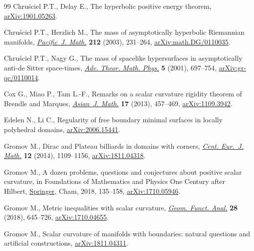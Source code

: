 \documentclass[pdftex]{sigma}
\numberwithin{equation}{section}
\theoremstyle{definition}
\begin{document}
\begin{thebibliography}{99}
Chru\'sciel P.T., Delay E., The hyperbolic positive energy theorem,
 \href{https://arxiv.org/abs/1901.05263}{arXiv:1901.05263}.

Chru\'sciel P.T., Herzlich M., The mass of asymptotically hyperbolic
 {R}iemannian manifolds, \href{https://doi.org/10.2140/pjm.2003.212.231}{\textit{Pacific~J. Math.}} \textbf{212} (2003),
 231--264, \href{https://arxiv.org/abs/math.DG/0110035}{arXiv:math.DG/0110035}.

Chru\'sciel P.T., Nagy G., The mass of spacelike hypersurfaces in
 asymptotically anti-de {S}itter space-times, \href{https://doi.org/10.4310/ATMP.2001.v5.n4.a3}{\textit{Adv. Theor. Math. Phys.}}
 \textbf{5} (2001), 697--754, \href{https://arxiv.org/abs/gr-qc/0110014}{arXiv:gr-qc/0110014}.

Cox G., Miao P., Tam L.-F., Remarks on a scalar curvature rigidity theorem of
 {B}rendle and {M}arques, \href{https://doi.org/10.4310/AJM.2013.v17.n3.a4}{\textit{Asian~J. Math.}} \textbf{17} (2013),
 457--469, \href{https://arxiv.org/abs/1109.3942}{arXiv:1109.3942}.

Edelen N., Li C., Regularity of free boundary minimal surfaces in locally
 polyhedral domains, \href{https://arxiv.org/abs/2006.15441}{arXiv:2006.15441}.

Gromov M., Dirac and {P}lateau billiards in domains with corners, \href{https://doi.org/10.2478/s11533-013-0399-1}{\textit{Cent.
 Eur.~J. Math.}} \textbf{12} (2014), 1109--1156, \href{https://arxiv.org/abs/1811.04318}{arXiv:1811.04318}.

Gromov M., A dozen problems, questions and conjectures about positive scalar
 curvature, in Foundations of Mathematics and Physics One Century after
 {H}ilbert, \href{https://doi.org/10.1007/978-3-319-64813-2_6}{Springer}, Cham, 2018, 135--158, \href{https://arxiv.org/abs/1710.05946}{arXiv:1710.05946}.

Gromov M., Metric inequalities with scalar curvature, \href{https://doi.org/10.1007/s00039-018-0453-z}{\textit{Geom. Funct.
 Anal.}} \textbf{28} (2018), 645--726, \href{https://arxiv.org/abs/1710.04655}{arXiv:1710.04655}.

Gromov M., Scalar curvature of manifolds with boundaries: natural questions and
 artificial constructions, \href{https://arxiv.org/abs/1811.04311}{arXiv:1811.04311}.


\end{thebibliography}
\end{document}

